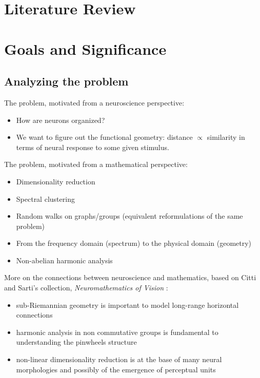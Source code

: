 \section{Literature Review}


\section{Goals and Significance}


\subsection{Analyzing the problem}
\par The problem, motivated from a neuroscience perspective:
\begin{itemize}
    \item How are neurons organized?
    \item We want to figure out the functional geometry: distance  $\propto$ similarity in terms of neural response to some given stimulus.
\end{itemize}

\par The problem, motivated from a mathematical perspective:
\begin{itemize}
    \item Dimensionality reduction 
    \item Spectral clustering
    \item Random walks on graphs/groups (equivalent reformulations of the same problem)
    \item From the frequency domain (spectrum) to the physical domain (geometry)
    \item Non-abelian harmonic analysis
\end{itemize}

\par More on the connections between neuroscience and mathematics, based on Citti and Sarti's collection, \textit{Neuromathematics of Vision} \cite{citti_neuromathematics_2014}:
\begin{itemize}
    \item sub-Riemannian geometry is important to model long-range horizontal connections
    \item harmonic analysis in non commutative groups is fundamental to understanding the pinwheels structure 
    \item non-linear dimensionality reduction is at the base of many neural morphologies and possibly of the emergence of perceptual units
\end{itemize}

